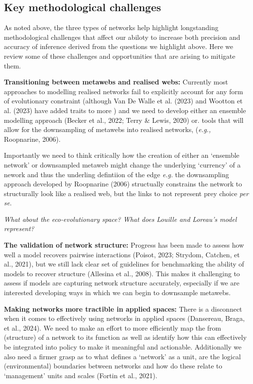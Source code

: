 \documentclass[
]{article}
\begin{document}
\subsection{Key methodological
challenges}\label{key-methodological-challenges}

As noted above, the three types of networks help highlight longstanding
methodological challenges that affect our abiloty to increase both
precision and accuracy of inference derived from the questions we
highlight above. Here we review some of these challenges and
opportunities that are arising to mitigate them.

\textbf{Transitioning between metawebs and realised webs:} Currently
most approaches to modelling realised networks fail to explicitly
account for any form of evolutionary constraint (although Van De Walle
et al. (2023) and Wootton et al. (2023) have added traits to more ) and
we need to develop either an ensemble modelling approach (Becker et al.,
2022; Terry \& Lewis, 2020) or. tools that will allow for the
downsampling of metawebs into realised networks, (\emph{e.g.,}
Roopnarine, 2006).

Importantly we need to think critically how the creation of either an
`ensemble network' or downsampled metaweb might change the underlying
`currency' of a nework and thus the underling defintiion of the edge
\emph{e.g.} the downsampling approach developed by Roopnarine (2006)
structually constrains the network to structurally look like a realised
web, but the links to not represent prey choice \emph{per se}.

\emph{What about the eco-evolutionary space? What does Louille and
Loreau's model represent?}

\textbf{The validation of network structure:} Progress has been made to
assess how well a model recovers pairwise interactions (Poisot, 2023;
Strydom, Catchen, et al., 2021), but we still lack clear set of
guidelines for benchmarking the ability of models to recover structure
(Allesina et al., 2008). This makes it challenging to assess if models
are capturing network structure accurately, especially if we are
interested developing ways in which we can begin to downsample metawebs.

\textbf{Making networks more tractible in applied spaces:} There is a
disconnect when it comes to effectively using networks in applied spaces
(Dansereau, Braga, et al., 2024). We need to make an effort to more
efficiently map the from (structure) of a network to its function as
well as identify how this can effectively be integrated into policy to
make it meaningful and actionable. Additionally we also need a firmer
grasp as to what defines a `network' as a unit, are the logical
(environmental) boundaries between networks and how do these relate to
`management' units and scales (Fortin et al., 2021).
\end{document}
